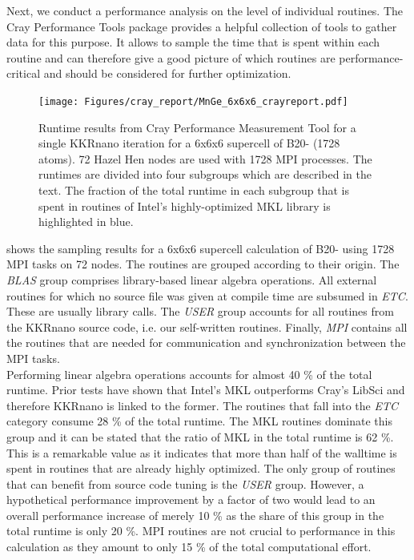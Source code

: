\documentclass [a4paper, 12pt]{article}
\begin{document}
Next, we conduct a performance analysis on the level of individual routines.
The Cray Performance Tools package provides a helpful collection of tools to gather data for this purpose.
It allows to sample the time that is spent within each routine and can therefore give a good
picture of which routines are performance-critical and should be considered for further optimization.
\\
\begin{figure}[h]
\begin{center}
 \texttt{[image: Figures/cray\_report/MnGe\_6x6x6\_crayreport.pdf]}
\end{center}
	\caption{Runtime results from Cray Performance Measurement Tool for a single KKRnano iteration 
	for a 6x6x6 supercell of B20- (1728 atoms). 72 Hazel Hen nodes are used with 1728 MPI processes.
	The runtimes are divided into four subgroups which are described in the text.
	The fraction of the total runtime in each subgroup that is spent in
	routines of Intel's highly-optimized MKL library is highlighted in blue.
	}
\label{fig:MnGe_6x6x6_crayreport}
\end{figure}
 shows the sampling results for a 6x6x6 supercell calculation
of B20- using 1728 MPI tasks on 72 nodes.
The routines are grouped according to their origin. The \textit{BLAS} group comprises
library-based linear algebra operations. 
All external routines for which no source file was given at compile time are subsumed
in \textit{ETC}. These are usually library calls.
The \textit{USER} group accounts for all routines from the KKRnano source code, i.e. our self-written routines.
Finally, \textit{MPI} contains all the routines that are needed for communication and synchronization
between the MPI tasks. 
\\
Performing linear algebra operations accounts for almost 40 \% of the total runtime. Prior tests have shown that
Intel's MKL outperforms Cray's LibSci and therefore KKRnano is linked to the former.
The routines that fall into the \textit{ETC} category consume 28 \% of the total runtime. 
The MKL routines dominate this group and it can be stated that the ratio of MKL in the total runtime is 62 \%.
This is a remarkable value as it indicates that more than half of the walltime is spent in routines
that are already highly optimized.
The only group of routines that can benefit from source code tuning is the \textit{USER} group.
However, a hypothetical performance improvement by a factor of two would lead to
an overall performance increase of merely 10 \% as the share of this group in the total runtime is only 20 \%.
MPI routines are not crucial to performance in this calculation as they amount to only 15 \% of the total
computational effort.
\end{document}
